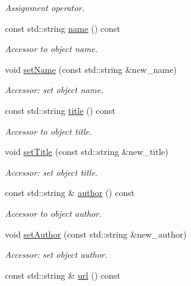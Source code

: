\begin{DoxyCompactItemize}
\begin{DoxyCompactList}\small\item\em Assignment operator. \end{DoxyCompactList}\item 
const std\+::string \hyperlink{class_d_d4hep_1_1_geometry_1_1_header_a03877a8fa5ca87fc1d8b73984761e345}{name} () const
\begin{DoxyCompactList}\small\item\em Accessor to object name. \end{DoxyCompactList}\item 
void \hyperlink{class_d_d4hep_1_1_geometry_1_1_header_ae65f0f1c5b9f6c5697d0831a19b4056c}{set\+Name} (const std\+::string \&new\+\_\+name)
\begin{DoxyCompactList}\small\item\em Accessor\+: set object name. \end{DoxyCompactList}\item 
const std\+::string \hyperlink{class_d_d4hep_1_1_geometry_1_1_header_a3d7080213e2473958f795a86df89a06c}{title} () const
\begin{DoxyCompactList}\small\item\em Accessor to object title. \end{DoxyCompactList}\item 
void \hyperlink{class_d_d4hep_1_1_geometry_1_1_header_a5e718143f204d4c58721e145772b896c}{set\+Title} (const std\+::string \&new\+\_\+title)
\begin{DoxyCompactList}\small\item\em Accessor\+: set object title. \end{DoxyCompactList}\item 
const std\+::string \& \hyperlink{class_d_d4hep_1_1_geometry_1_1_header_adfdf3966395650c581b177d1d238a398}{author} () const
\begin{DoxyCompactList}\small\item\em Accessor to object author. \end{DoxyCompactList}\item 
void \hyperlink{class_d_d4hep_1_1_geometry_1_1_header_a7efa4948ea5e1a980bc15a88522f7618}{set\+Author} (const std\+::string \&new\+\_\+author)
\begin{DoxyCompactList}\small\item\em Accessor\+: set object author. \end{DoxyCompactList}\item 
const std\+::string \& \hyperlink{class_d_d4hep_1_1_geometry_1_1_header_a1c44ca4ccbe7e7861ac8e777f43469d3}{url} () const

\end{DoxyCompactItemize}
